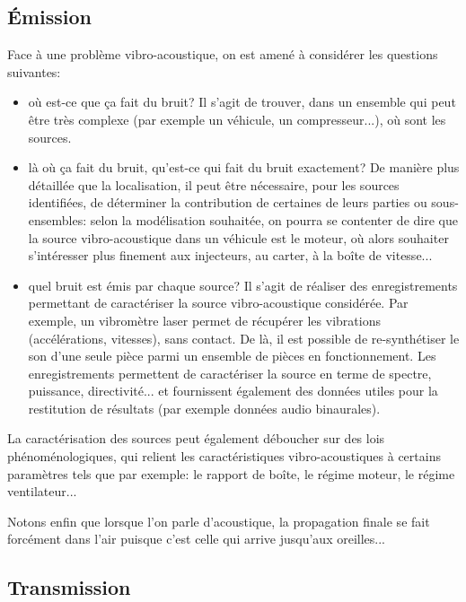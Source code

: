 \medskip
\subsection{Émission}

Face à une problème vibro-acoustique, on est amené à considérer les questions suivantes:
\begin{itemize}
   \item {} où est-ce que ça fait du bruit? Il s'agit de trouver, dans un ensemble qui peut être très complexe (par exemple un véhicule, un compresseur...), où sont les sources.
   \item {} là où ça fait du bruit, qu’est-ce qui fait du bruit exactement? De manière plus détaillée que la localisation, il peut être nécessaire, pour les sources identifiées, de déterminer la contribution de certaines de leurs parties ou sous-ensembles: selon la modélisation souhaitée, on pourra se contenter de dire que la source vibro-acoustique dans un véhicule est le moteur, où alors souhaiter s'intéresser plus finement aux injecteurs, au carter, à la boîte de vitesse...
   \item {} quel bruit est émis par chaque source? Il s'agit de réaliser des enregistrements permettant de caractériser la source vibro-acoustique considérée. Par exemple, un vibromètre laser permet de récupérer les vibrations (accélérations, vitesses), sans contact. De là, il est possible de re-synthétiser le son d'une seule pièce parmi un ensemble de pièces en fonctionnement. Les enregistrements permettent de caractériser la source en terme de spectre, puissance, directivité... et fournissent également des données utiles pour la restitution de résultats (par exemple données audio binaurales).
\end{itemize}

\medskip
La caractérisation des sources peut également déboucher sur des lois phénoménologiques, qui relient les caractéristiques vibro-acoustiques à certains paramètres tels que par exemple: le rapport de boîte, le régime moteur, le régime ventilateur...

\medskip
Notons enfin que lorsque l'on parle d'acoustique, la propagation finale se fait forcément dans l'air puisque c'est celle qui arrive jusqu'aux oreilles...

\medskip
\subsection{Transmission}

